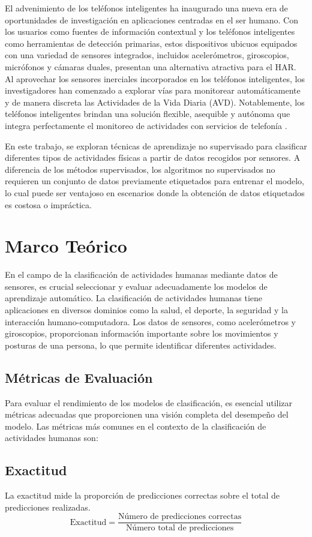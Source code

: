 \documentclass{esannV2}
\begin{document}
El advenimiento de los teléfonos inteligentes ha inaugurado una nueva era de oportunidades de investigación en aplicaciones centradas en el ser humano. Con los usuarios como fuentes de información contextual y los teléfonos inteligentes como herramientas de detección primarias, estos dispositivos ubicuos equipados con una variedad de sensores integrados, incluidos acelerómetros, giroscopios, micrófonos y cámaras duales, presentan una alternativa atractiva para el HAR. Al aprovechar los sensores inerciales incorporados en los teléfonos inteligentes, los investigadores han comenzado a explorar vías para monitorear automáticamente y de manera discreta las Actividades de la Vida Diaria (AVD). Notablemente, los teléfonos inteligentes brindan una solución flexible, asequible y autónoma que integra perfectamente el monitoreo de actividades con servicios de telefonía \cite{esann2013}.

En este trabajo, se exploran técnicas de aprendizaje no supervisado para clasificar diferentes tipos de actividades físicas a partir de datos recogidos por sensores. A diferencia de los métodos supervisados, los algoritmos no supervisados no requieren un conjunto de datos previamente etiquetados para entrenar el modelo, lo cual puede ser ventajoso en escenarios donde la obtención de datos etiquetados es costosa o impráctica.
\section{Marco Teórico}
En el campo de la clasificación de actividades humanas mediante datos de sensores, es crucial seleccionar y evaluar adecuadamente los modelos de aprendizaje automático. La clasificación de actividades humanas tiene aplicaciones en diversos dominios como la salud, el deporte, la seguridad y la interacción humano-computadora. Los datos de sensores, como acelerómetros y giroscopios, proporcionan información importante sobre los movimientos y posturas de una persona, lo que permite identificar diferentes actividades.

\subsection{Métricas de Evaluación}
Para evaluar el rendimiento de los modelos de clasificación, es esencial utilizar métricas adecuadas que proporcionen una visión completa del desempeño del modelo. Las métricas más comunes en el contexto de la clasificación de actividades humanas son:

\subsection*{Exactitud}
La exactitud mide la proporción de predicciones correctas sobre el total de predicciones realizadas.
\begin{equation}
\text{Exactitud} = \frac{\text{Número de predicciones correctas}}{\text{Número total de predicciones}}
\end{equation}
\end{document}
